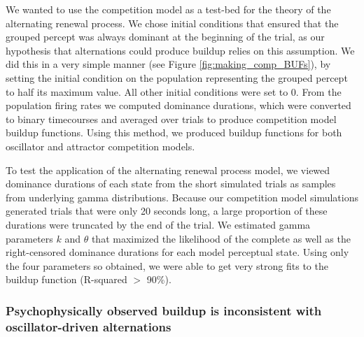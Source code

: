 \documentclass{frontiersSCNS} %
\begin{document}
We wanted to use the competition model as a test-bed for the theory of the alternating renewal process. We chose initial conditions that ensured that the grouped percept was always dominant at the beginning of the trial, as our hypothesis that alternations could produce buildup relies on this assumption. We did this in a very simple manner (see Figure \ref{fig:making_comp_BUFs}), by setting the initial condition on the population representing the grouped percept to half its maximum value. All other initial conditions were set to 0. From the population firing rates we computed dominance durations, which were converted to binary timecourses and averaged over trials to produce competition model buildup functions. Using this method, we produced buildup functions for both oscillator and attractor competition models.

To test the application of the alternating renewal process model, we viewed dominance durations of each state from the short simulated trials as samples from underlying gamma distributions. Because our competition model simulations generated trials that were only 20 seconds long, a large proportion of these durations were truncated by the end of the trial. We estimated gamma parameters $k$ and $\theta$ that maximized the likelihood of the complete as well as the right-censored dominance durations for each model perceptual state. Using only the four parameters so obtained, we were able to get very strong fits to the buildup function (R-squared $>$ 90\%).

\subsubsection{Psychophysically observed buildup is inconsistent with oscillator-driven alternations}
\end{document}
